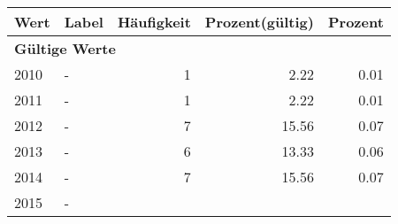      \begin{longtable}{lXrrr}
     \toprule
     \textbf{Wert} & \textbf{Label} & \textbf{Häufigkeit} & \textbf{Prozent(gültig)} & \textbf{Prozent} \\
     \endhead
     \midrule
     \multicolumn{5}{l}{\textbf{Gültige Werte}}\\

     2010 &
     \multicolumn{1}{X}{ -  } &


       \num{1} &
       \num[round-mode=places,round-precision=2]{2,22} &
         \num[round-mode=places,round-precision=2]{0,01} \\

     2011 &
     \multicolumn{1}{X}{ -  } &


       \num{1} &
       \num[round-mode=places,round-precision=2]{2,22} &
         \num[round-mode=places,round-precision=2]{0,01} \\

     2012 &
     \multicolumn{1}{X}{ -  } &


       \num{7} &
       \num[round-mode=places,round-precision=2]{15,56} &
         \num[round-mode=places,round-precision=2]{0,07} \\

     2013 &
     \multicolumn{1}{X}{ -  } &


       \num{6} &
       \num[round-mode=places,round-precision=2]{13,33} &
         \num[round-mode=places,round-precision=2]{0,06} \\

     2014 &
     \multicolumn{1}{X}{ -  } &


       \num{7} &
       \num[round-mode=places,round-precision=2]{15,56} &
         \num[round-mode=places,round-precision=2]{0,07} \\

     2015 &
     \multicolumn{1}{X}{ -  } &



\end{longtable}
